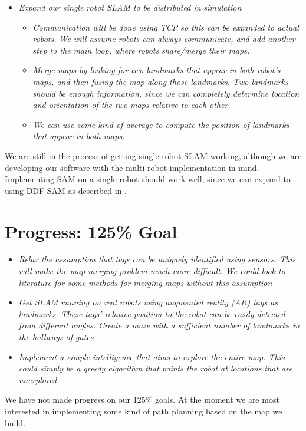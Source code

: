 \documentclass[11pt]{article}
\begin{document}
\begin{itemize}
    \item \emph{Expand our single robot SLAM to be distributed in simulation}
    \begin{itemize}
        \item \emph{Communication will be done using TCP so this can be expanded to actual robots. We will assume robots can always communicate, and add another step to the main loop, where robots share/merge their maps.}
        \item \emph{Merge maps by looking for two landmarks that appear in both robot's maps, and then fusing the map along those landmarks. Two landmarks should be enough information, since we can completely determine location and orientation of the two maps relative to each other.}
        \item \emph{We can use some kind of average to compute the position of landmarks that appear in both maps.}
    \end{itemize}
\end{itemize}

We are still in the process of getting single robot SLAM working, although we are developing our software with the multi-robot implementation in mind. Implementing SAM on a single robot should work well, since we can expand to using DDF-SAM as described in \cite{cunningham2010}.

\section{Progress: 125\% Goal}
\begin{itemize}
    \item \emph{Relax the assumption that tags can be uniquely identified using sensors. This will make the map merging problem much more difficult. We could look to literature for some methods for merging maps without this assumption}
    \item \emph{Get SLAM running on real robots using augmented reality (AR) tags as landmarks. These tags' relative position to the robot can be easily detected from different angles. Create a maze with a sufficient number of landmarks in the hallways of gates}
    \item \emph{Implement a simple intelligence that aims to explore the entire map. This could simply be a greedy algorithm that points the robot at locations that are unexplored.}
\end{itemize}

We have not made progress on our 125\% goals. At the moment we are most interested in implementing some kind of path planning based on the map we build.
\end{document}
